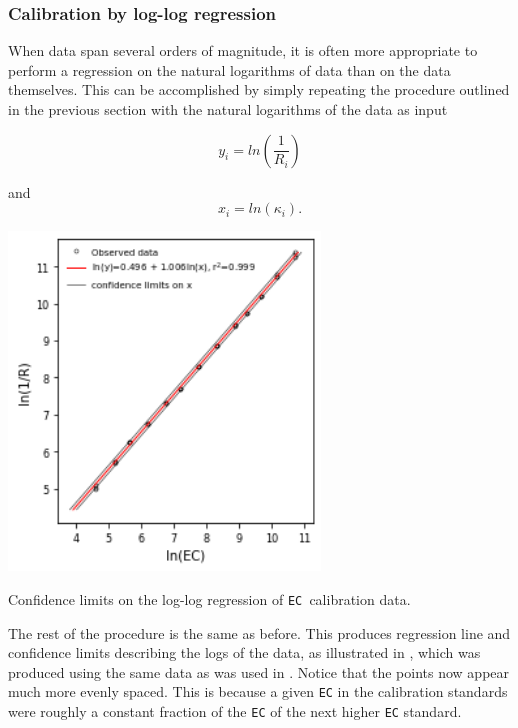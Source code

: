 \subsubsection{Calibration by log-log regression}

When data span several orders of magnitude, it is often more appropriate to perform a regression on the natural logarithms of data than on the data themselves. This can be accomplished by simply repeating the procedure outlined in the previous section with the natural logarithms of the data as input

\begin{equation}
	y_i = ln\left ( \frac{1}{R_i} \right )
\end{equation}

and
\begin{equation}
	x_i = ln(\kappa_i).  
\end{equation}

\begin{marginfigure}[0cm]
	\begin{center}
		\includegraphics[height=9cm]{Images/log_confidence.png}
		\caption[Confidence Limits on Log-Log Regression]{Confidence limits on the log-log regression of \texttt{EC }calibration data.}
	\end{center}
\end{marginfigure}

The rest of the procedure is the same as before.  This produces regression line and confidence limits describing the logs of the data, as illustrated in , which was produced using the same data as was used in . Notice that the points now appear much more evenly spaced. This is because a given \texttt{EC} in the calibration standards were roughly a constant fraction of the \texttt{EC} of the next higher \texttt{EC} standard.

